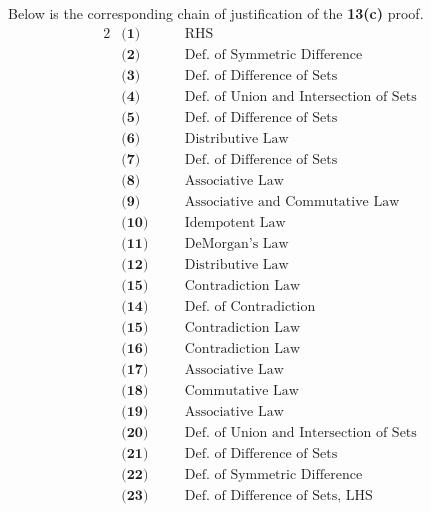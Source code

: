 Below is the corresponding chain of justification of the \textbf{13(c)} proof.
\begin{alignat*}{2}
&\textbf{(1)} && \quad \text{RHS}\\
&\textbf{(2)} && \quad \text{Def. of Symmetric Difference}\\
&\textbf{(3)} && \quad \text{Def. of Difference  of Sets}\\
&\textbf{(4)} && \quad \text{Def. of Union and Intersection of Sets}\\
&\textbf{(5)} && \quad \text{Def. of Difference  of Sets}\\
&\textbf{(6)} && \quad \text{Distributive Law}\\
&\textbf{(7)} && \quad \text{Def. of Difference  of Sets}\\
&\textbf{(8)} && \quad \text{Associative Law}\\
&\textbf{(9)} && \quad \text{Associative and Commutative Law}\\
&\textbf{(10)} && \quad \text{Idempotent Law}\\
&\textbf{(11)} && \quad \text{DeMorgan's Law}\\
&\textbf{(12)} && \quad \text{Distributive Law}\\
&\textbf{(15)} && \quad \text{Contradiction Law}\\
&\textbf{(14)} && \quad \text{Def. of Contradiction}\\
&\textbf{(15)} && \quad \text{Contradiction Law}\\
&\textbf{(16)} && \quad \text{Contradiction Law}\\
&\textbf{(17)} && \quad \text{Associative Law}\\
&\textbf{(18)} && \quad \text{Commutative Law}\\
&\textbf{(19)} && \quad \text{Associative Law}\\
&\textbf{(20)} && \quad \text{Def. of Union and Intersection of Sets}\\
&\textbf{(21)} && \quad \text{Def. of Difference of Sets}\\
&\textbf{(22)} && \quad \text{Def. of Symmetric Difference}\\
&\textbf{(23)} && \quad \text{Def. of Difference of Sets, LHS}\\
\end{alignat*}
\pagebreak